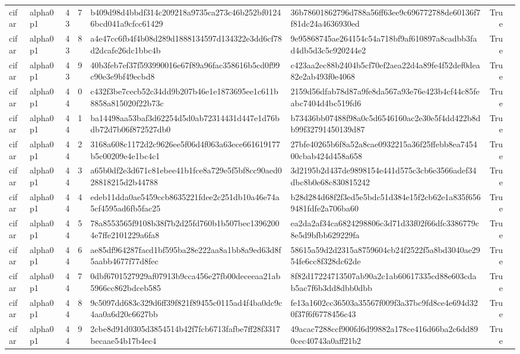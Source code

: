 \begin{tabular}{llrrllrl}
cifar & alpha0p1 & 43 & 7 & b409d98d4bbdf314c209218a9735ca273c46b252bf01246bcd041a9cfcc61429 & 36b78601862796d788a56ff63ee9c696772788de60136f7f81dc24a4636930ed & True &  \\
cifar & alpha0p1 & 43 & 8 & a4e47cc6fb4f4b08d289d1888134597d134322e3dd6cf78d2dcafe26dc1bbc4b & 9e95868745ae264154c54a718bf9af610897a8cadbb3fad4db5d3c5c920244e2 & True &  \\
cifar & alpha0p1 & 43 & 9 & 40b3feb7ef37f593990016e67f89a96fac358616b5cd0f99c90e3e9bf49ecbd8 & c423aa2ec88b2404b5cf70ef2aea22d4a89fe4f52def0dea82e2ab493f0e4068 & True &  \\
cifar & alpha0p1 & 44 & 0 & c432f3be7cecb52c34dd9b207b46e1e1873695ee1c611b8858a815020f22b73c & 2159d56dfab78d87a9fe8da567a93e76e423b4cf44c85feabc7404d4bc519fd6 & True &  \\
cifar & alpha0p1 & 44 & 1 & ba14498aa53baf3d62254d5d0ab72314431d447e1d76bdb72d7b06f872527db0 & b73436bb07488f98a0c5d6546160ac2e30e5f4dd422b8db99f32791450139d87 & True &  \\
cifar & alpha0p1 & 44 & 2 & 3168a608c1172d2c9626ee5f06d4f063a63ece661619177b5c00209e4e1bc4c1 & 27bfe40265b6f8a52a8cae0932215a36f25ffebb8ea745400cbab424d458a658 & True &  \\
cifar & alpha0p1 & 44 & 3 & a65b0df2e3d671c81ebee41b1fce8a729e5f5bf8cc90aed028818215d2b44788 & 3d2195b2d437de9898154e441d575c3cb6e3566adef34dbc8b0e68c830815242 & True &  \\
cifar & alpha0p1 & 44 & 4 & edeb11dda0ae5459ccb8635221fdee2c251db10a46e74a5cf4595ad6fb5fac25 & b28d284d68f2f3ed5e5bdc51d384e15f2cb62e1a835f6569481fdfe2a706ba60 & True &  \\
cifar & alpha0p1 & 44 & 5 & 78a8553565f9108b38f7b2d25fd760b1b507bec13962004e7ffe2101229a6fa8 & ea2da2af34ca6824298806c3d71d33f02f66dfc3386779c8e5d9bfbb629229fa & True &  \\
cifar & alpha0p1 & 44 & 6 & ae85df964287facd1bf595ba28e222aa8a1bb8a9ed63d8f5aabb4677f77d8fec & 58615a59d2d2315a8759604cb24f2522f5a8bd3040ae2954fe6cc8f328dc62de & True &  \\
cifar & alpha0p1 & 44 & 7 & 0dbf6701527929af07913b9cca456e27fb00deceeaa21ab5966cc862bdceb585 & 8f82d17224713507ab90a2c1ab60617335cd88e603cdab5ac7f6b3dd8dbb0dbb & True &  \\
cifar & alpha0p1 & 44 & 8 & 9c5097dd683c329d6ff39f821f89455c0115ad4f4ba0dc9c4aa0a6d20c6627bb & fe13a1602cc36503a35567f009f3a37bc9fd8ce4e694d320f37f6f6778456c43 & True &  \\
cifar & alpha0p1 & 44 & 9 & 2cbe8d91d0305d3854514b42f7fcb6713fafbe7ff28f3317becaae54b17b4ec4 & 49acac7288ccf900fd6d99882a178ce416d66ba2c6dd890cec40743a0aff21b2 & True &  \\

\end{tabular}
